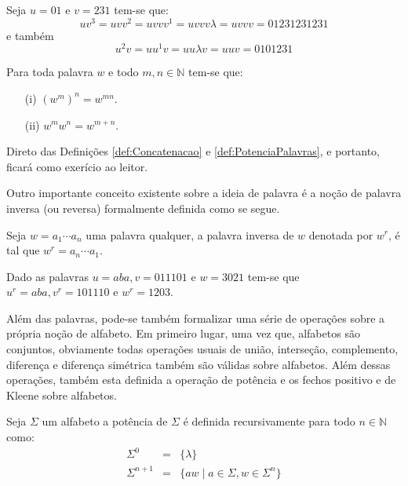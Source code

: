 \begin{exemplo}
	Seja $u = 01$ e $v = 231$ tem-se que: 
	$$uv^3 = uvv^2 = uvvv^1 = uvvv\lambda = uvvv = 01231231231$$
	e também 
	$$u^2v = uu^1v = uu\lambda v = uuv = 0101231$$
\end{exemplo}

\begin{lema}
  Para toda palavra $w$ e todo $m,n \in \mathbb{N}$ tem-se que:
	\begin{itemize}
		\item[(i)] $(w^m)^n = w^{mn}$.
		\item[(ii)] $w^mw^n = w^{m+n}$.
	\end{itemize}  
\end{lema}

\begin{prova}
	Direto das Definições \ref{def:Concatenacao} e \ref{def:PotenciaPalavras}, e portanto, ficará como exerício ao leitor.
\end{prova}

Outro importante conceito existente sobre a ideia de palavra é a noção de palavra inversa (ou reversa) formalmente definida como se segue.

\begin{definicao}\label{def:PalavraInversa}
	\cite{valdi2016master} Seja $w = a_1\cdots a_n$ uma palavra qualquer, a palavra inversa de $w$ denotada por $w^r$, é tal que $w^r = a_n\cdots a_1$. 
\end{definicao}

\begin{exemplo}
	Dado as palavras $u = aba, v = 011101$ e $w = 3021$ tem-se que $u^r = aba, v^r = 101110$ e $w^r = 1203$.
\end{exemplo}

Além das palavras, pode-se também formalizar uma série de operações sobre a própria noção de alfabeto. Em primeiro lugar, uma vez que,  alfabetos são conjuntos, obviamente todas operações usuais de união, interseção, complemento, diferença e diferença simétrica também são válidas sobre alfabetos. Além dessas operações, também esta definida a operação de potência e os fechos positivo e de Kleene sobre alfabetos.

\begin{definicao}\label{def:PotenciaAlfabeto}
	\cite{benjaLivro2010} Seja $\Sigma$ um alfabeto a potência de $\Sigma$ é definida recursivamente para todo $n \in \mathbb{N}$ como:
	\begin{eqnarray}
		\Sigma^0 & = & \{\lambda\}\\
		\Sigma^{n+1} & = & \{aw \mid a \in \Sigma, w \in \Sigma^{n}\}
	\end{eqnarray}
\end{definicao}


